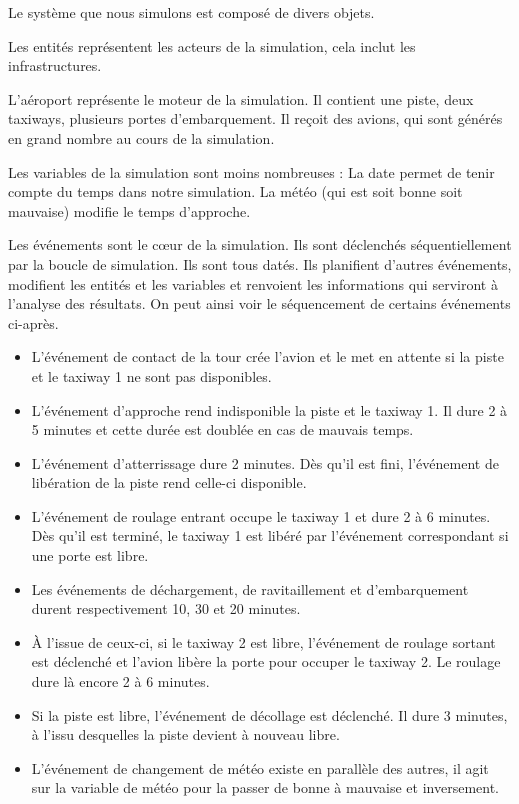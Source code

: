Le système que nous simulons est composé de divers objets. 

Les entités représentent les acteurs de la simulation, cela inclut les infrastructures.

L'aéroport représente le moteur de la simulation. Il contient une piste, deux taxiways, plusieurs portes d'embarquement. Il reçoit des avions, qui sont générés en grand nombre au cours de la simulation.
  
Les variables de la simulation sont moins nombreuses : La date permet de tenir compte du temps dans notre simulation. La météo (qui est soit bonne soit mauvaise) modifie le temps d'approche.
  
Les événements sont le cœur de la simulation. Ils sont déclenchés séquentiellement par la boucle de simulation. Ils sont tous datés. Ils planifient d'autres événements, modifient les entités et les variables et renvoient les informations qui serviront à l'analyse des résultats. On peut ainsi voir le séquencement de certains événements ci-après.
\begin{itemize}
\item L’événement de contact de la tour crée l'avion et le met en attente si la piste et le taxiway 1 ne sont pas disponibles.
\item L’événement d'approche rend indisponible la piste et le taxiway 1. Il dure 2 à 5 minutes et cette durée est doublée en cas de mauvais temps.
\item L’événement d'atterrissage dure 2 minutes. Dès qu'il est fini, l’événement de libération de la piste rend celle-ci disponible.
\item L’événement de roulage entrant occupe le taxiway 1 et dure 2 à 6 minutes. Dès qu'il est terminé, le taxiway 1 est libéré par l’événement correspondant si une porte est libre. 
\item Les événements de déchargement, de ravitaillement et d'embarquement durent respectivement 10, 30 et 20 minutes.
\item À l'issue de ceux-ci, si le taxiway 2 est libre, l’événement de roulage sortant est déclenché et l'avion libère la porte pour occuper le taxiway 2. Le roulage dure là encore 2 à 6 minutes.
\item Si la piste est libre, l’événement de décollage est déclenché. Il dure 3 minutes, à l'issu desquelles la piste devient à nouveau libre.

\item L’événement de changement de météo existe en parallèle des autres, il agit sur la variable de météo pour la passer de bonne à mauvaise et inversement.
\end{itemize}